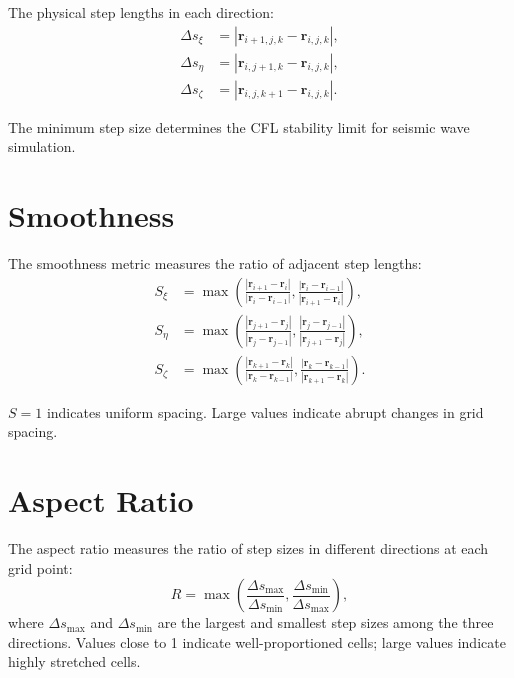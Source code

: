 \documentclass[11pt,a4paper]{report}
\newcommand{\rvec}{\bm{r}}
\begin{document}
The physical step lengths in each direction:
\begin{equation}
\begin{aligned}
    \Delta s_\xi &= |\rvec_{i+1,j,k} - \rvec_{i,j,k}|, \\
    \Delta s_\eta &= |\rvec_{i,j+1,k} - \rvec_{i,j,k}|, \\
    \Delta s_\zeta &= |\rvec_{i,j,k+1} - \rvec_{i,j,k}|.
\end{aligned}
\end{equation}

The minimum step size determines the CFL stability limit for seismic wave simulation.

\section{Smoothness}

The smoothness metric measures the ratio of adjacent step lengths:
\begin{equation}
\begin{aligned}
    S_\xi &= \max\left( \frac{|\rvec_{i+1} - \rvec_i|}{|\rvec_i - \rvec_{i-1}|}, \frac{|\rvec_i - \rvec_{i-1}|}{|\rvec_{i+1} - \rvec_i|} \right), \\
    S_\eta &= \max\left( \frac{|\rvec_{j+1} - \rvec_j|}{|\rvec_j - \rvec_{j-1}|}, \frac{|\rvec_j - \rvec_{j-1}|}{|\rvec_{j+1} - \rvec_j|} \right), \\
    S_\zeta &= \max\left( \frac{|\rvec_{k+1} - \rvec_k|}{|\rvec_k - \rvec_{k-1}|}, \frac{|\rvec_k - \rvec_{k-1}|}{|\rvec_{k+1} - \rvec_k|} \right).
\end{aligned}
\end{equation}

$S = 1$ indicates uniform spacing. Large values indicate abrupt changes in grid spacing.

\section{Aspect Ratio}

The aspect ratio measures the ratio of step sizes in different directions at each grid point:
\begin{equation}
    R = \max\left( \frac{\Delta s_{\max}}{\Delta s_{\min}}, \frac{\Delta s_{\min}}{\Delta s_{\max}} \right),
\end{equation}
where $\Delta s_{\max}$ and $\Delta s_{\min}$ are the largest and smallest step sizes among the three directions. Values close to 1 indicate well-proportioned cells; large values indicate highly stretched cells.
\end{document}
